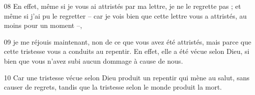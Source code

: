 
08 En effet, même si je vous ai attristés par ma lettre, je ne le regrette pas ; et même si j’ai pu le regretter – car je vois bien que cette lettre vous a attristés, au moins pour un moment –,

09 je me réjouis maintenant, non de ce que vous avez été attristés, mais parce que cette tristesse vous a conduits au repentir. En effet, elle a été vécue selon Dieu, si bien que vous n’avez subi aucun dommage à cause de nous.

10 Car une tristesse vécue selon Dieu produit un repentir qui mène au salut, sans causer de regrets, tandis que la tristesse selon le monde produit la mort.